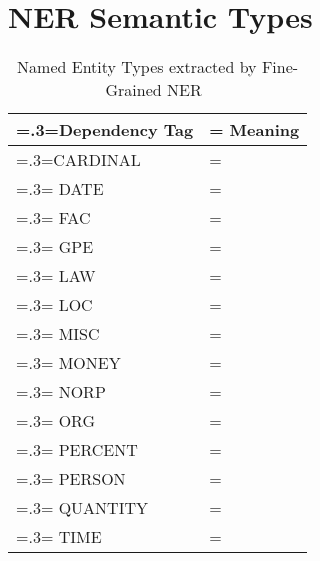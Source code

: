 \chapter{\vspace{-3px}NER Semantic Types}

\vspace{-3em}
\begin{table}[H]
    \centering
    \renewcommand{\arraystretch}{1.2}
    \begin{tabularx}{0.8\textwidth}{|>{\hsize=.3\hsize\linewidth=\hsize}X|>{\hsize=0.7\hsize\linewidth=\hsize}X|} 
     \hline
      \textbf{Dependency Tag} & \textbf{Meaning} \\
     \hline
        CARDINAL &  \\
        \hline
        DATE &  \\
        \hline
        FAC &  \\
        \hline
        GPE &  \\
        \hline
        LAW &  \\
        \hline
        LOC &  \\
        \hline
        MISC &  \\
        \hline
        MONEY & \\
        \hline
        NORP &  \\
        \hline
        ORG &  \\
        \hline
        PERCENT &  \\
        \hline
        PERSON &  \\
        \hline
        QUANTITY &  \\
        \hline
        TIME &  \\
    \hline
    \end{tabularx}
    \caption{Named Entity Types extracted by Fine-Grained NER~\cite{lample}}
    \label{appendix:semantic_types}
    \end{table}

    
